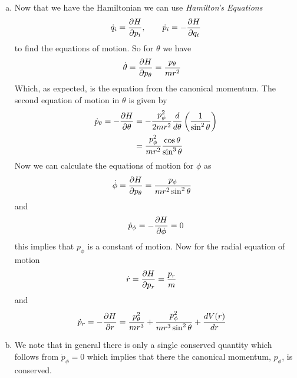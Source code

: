 \documentclass[11pt]{article}
\numberwithin{equation}{section}
\begin{document}
\begin{enumerate}[(a)]
\item Now that we have the Hamiltonian we can use \emph{Hamilton's Equations}
\begin{equation}
\dot{q}_i = \frac{\partial{H}}{\partial{p_i}},\qquad \dot{p}_i = -\frac{\partial{H}}{\partial{q_i}}
\end{equation}
to find the equations of motion. So for $\theta$ we have
\begin{align*}
\dot{\theta} = \frac{\partial{H}}{\partial{p_{\theta}}} &= \frac{p_{\theta}}{mr^2}
\end{align*}
Which, as expected, is the equation from the canonical momentum. The second equation of 
motion in $\theta$ is given by
\begin{align*}
\dot{p}_{\theta} = -\frac{\partial{H}}{\partial{\theta}} &= -\frac{p_{\phi}^2}{2mr^2}\frac{d}{d\theta}\left(\frac{1}{\sin^2\theta}\right)\\
&= \frac{p_{\phi}^2}{mr^2}\frac{\cos\theta}{\sin^3\theta}
\end{align*}
Now we can calculate the equations of motion for $\phi$ as
\begin{align*}
\dot{\phi} = \frac{\partial{H}}{\partial{p_{\theta}}} &= \frac{p_{\phi}}{mr^2\sin^2\theta}
\end{align*}
and
$$\dot{p}_{\phi} = -\frac{\partial{H}}{\partial{\phi}} = 0$$
this implies that $p_{\phi}$ is a constant of motion. Now for the radial equation of motion 
\begin{align*}
\dot{r} &= \frac{\partial{H}}{\partial{p_{r}}} = \frac{p_{r}}{m}
\end{align*}
and
\begin{align*}
\dot{p}_{r} = -\frac{\partial{H}}{\partial{r}} &= \frac{p_{\theta}^2}{mr^3} + \frac{p_{\phi}^2}{mr^3\sin^2\theta} + \frac{dV(r)}{dr}
\end{align*}

\item We note that in general there is only a single conserved quantity which follows from 
$\dot{p}_{\phi} = 0$ which implies that there the canonical momentum, $p_{\phi}$, is conserved.
\end{enumerate}

\pagebreak
\end{document}
